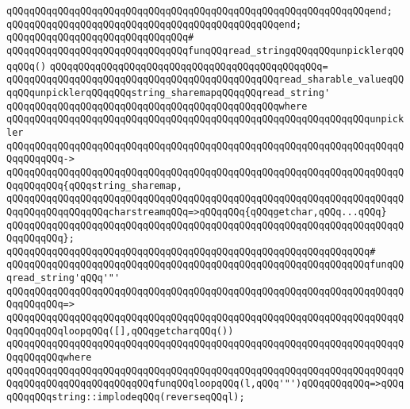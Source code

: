 \verb|qQQqqQQqqQQqqQQqqQQqqQQqqQQqqQQqqQQqqQQqqQQqqQQqqQQqqQQqqQQqqQQqend;|\newline
\verb|qQQqqQQqqQQqqQQqqQQqqQQqqQQqqQQqqQQqqQQqqQQqqQQqend;|\newline
\verb|qQQqqQQqqQQqqQQqqQQqqQQqqQQqqQQq#|\newline
\verb|qQQqqQQqqQQqqQQqqQQqqQQqqQQqqQQqfunqQQqread_stringqQQqqQQqunpicklerqQQqqQQq()|\newline
\verb|qQQqqQQqqQQqqQQqqQQqqQQqqQQqqQQqqQQqqQQqqQQqqQQq=|\newline
\verb|qQQqqQQqqQQqqQQqqQQqqQQqqQQqqQQqqQQqqQQqqQQqqQQqread_sharable_valueqQQqqQQqunpicklerqQQqqQQqstring_sharemapqQQqqQQqread_string'|\newline
\verb|qQQqqQQqqQQqqQQqqQQqqQQqqQQqqQQqqQQqqQQqqQQqqQQqwhere|\newline
\verb|qQQqqQQqqQQqqQQqqQQqqQQqqQQqqQQqqQQqqQQqqQQqqQQqqQQqqQQqqQQqqQQqunpickler|\newline
\verb|qQQqqQQqqQQqqQQqqQQqqQQqqQQqqQQqqQQqqQQqqQQqqQQqqQQqqQQqqQQqqQQqqQQqqQQqqQQqqQQq->|\newline
\verb|qQQqqQQqqQQqqQQqqQQqqQQqqQQqqQQqqQQqqQQqqQQqqQQqqQQqqQQqqQQqqQQqqQQqqQQqqQQqqQQq{qQQqstring_sharemap,|\newline
\verb|qQQqqQQqqQQqqQQqqQQqqQQqqQQqqQQqqQQqqQQqqQQqqQQqqQQqqQQqqQQqqQQqqQQqqQQqqQQqqQQqqQQqqQQqcharstreamqQQq=>qQQqqQQq{qQQqgetchar,qQQq...qQQq}|\newline
\verb|qQQqqQQqqQQqqQQqqQQqqQQqqQQqqQQqqQQqqQQqqQQqqQQqqQQqqQQqqQQqqQQqqQQqqQQqqQQqqQQq};|\newline
\newline
\verb|qQQqqQQqqQQqqQQqqQQqqQQqqQQqqQQqqQQqqQQqqQQqqQQqqQQqqQQqqQQqqQQq#|\newline
\verb|qQQqqQQqqQQqqQQqqQQqqQQqqQQqqQQqqQQqqQQqqQQqqQQqqQQqqQQqqQQqqQQqfunqQQqread_string'qQQq'"'|\newline
\verb|qQQqqQQqqQQqqQQqqQQqqQQqqQQqqQQqqQQqqQQqqQQqqQQqqQQqqQQqqQQqqQQqqQQqqQQqqQQqqQQq=>|\newline
\verb|qQQqqQQqqQQqqQQqqQQqqQQqqQQqqQQqqQQqqQQqqQQqqQQqqQQqqQQqqQQqqQQqqQQqqQQqqQQqqQQqloopqQQq([],qQQqgetcharqQQq())|\newline
\verb|qQQqqQQqqQQqqQQqqQQqqQQqqQQqqQQqqQQqqQQqqQQqqQQqqQQqqQQqqQQqqQQqqQQqqQQqqQQqqQQqwhere|\newline
\verb|qQQqqQQqqQQqqQQqqQQqqQQqqQQqqQQqqQQqqQQqqQQqqQQqqQQqqQQqqQQqqQQqqQQqqQQqqQQqqQQqqQQqqQQqqQQqqQQqfunqQQqloopqQQq(l,qQQq'"')qQQqqQQqqQQq=>qQQqqQQqqQQqstring::implodeqQQq(reverseqQQql);|\newline

